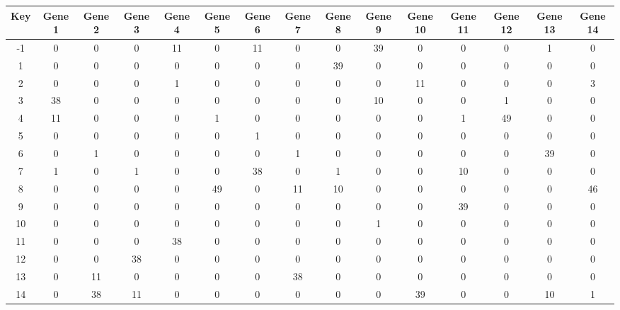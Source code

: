 \begin{tabular}{|c|c|c|c|c|c|c|c|c|c|c|c|c|c|c|}
\hline
Key & Gene 1 & Gene 2 & Gene 3 & Gene 4 & Gene 5 & Gene 6 & Gene 7 & Gene 8 & Gene 9 & Gene 10 & Gene 11 & Gene 12 & Gene 13 & Gene 14 \\
\hline
-1 & 0 & 0 & 0 & 11 & 0 & 11 & 0 & 0 & 39 & 0 & 0 & 0 & 1 & 0 \\
1 & 0 & 0 & 0 & 0 & 0 & 0 & 0 & 39 & 0 & 0 & 0 & 0 & 0 & 0 \\
2 & 0 & 0 & 0 & 1 & 0 & 0 & 0 & 0 & 0 & 11 & 0 & 0 & 0 & 3 \\
3 & 38 & 0 & 0 & 0 & 0 & 0 & 0 & 0 & 10 & 0 & 0 & 1 & 0 & 0 \\
4 & 11 & 0 & 0 & 0 & 1 & 0 & 0 & 0 & 0 & 0 & 1 & 49 & 0 & 0 \\
5 & 0 & 0 & 0 & 0 & 0 & 1 & 0 & 0 & 0 & 0 & 0 & 0 & 0 & 0 \\
6 & 0 & 1 & 0 & 0 & 0 & 0 & 1 & 0 & 0 & 0 & 0 & 0 & 39 & 0 \\
7 & 1 & 0 & 1 & 0 & 0 & 38 & 0 & 1 & 0 & 0 & 10 & 0 & 0 & 0 \\
8 & 0 & 0 & 0 & 0 & 49 & 0 & 11 & 10 & 0 & 0 & 0 & 0 & 0 & 46 \\
9 & 0 & 0 & 0 & 0 & 0 & 0 & 0 & 0 & 0 & 0 & 39 & 0 & 0 & 0 \\
10 & 0 & 0 & 0 & 0 & 0 & 0 & 0 & 0 & 1 & 0 & 0 & 0 & 0 & 0 \\
11 & 0 & 0 & 0 & 38 & 0 & 0 & 0 & 0 & 0 & 0 & 0 & 0 & 0 & 0 \\
12 & 0 & 0 & 38 & 0 & 0 & 0 & 0 & 0 & 0 & 0 & 0 & 0 & 0 & 0 \\
13 & 0 & 11 & 0 & 0 & 0 & 0 & 38 & 0 & 0 & 0 & 0 & 0 & 0 & 0 \\
14 & 0 & 38 & 11 & 0 & 0 & 0 & 0 & 0 & 0 & 39 & 0 & 0 & 10 & 1 \\
\hline
\end{tabular}